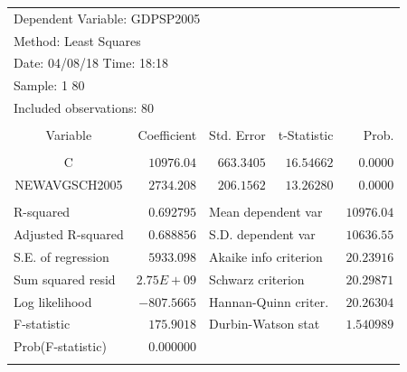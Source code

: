 \documentclass[12pt]{report}
\begin{document}
\begin{table}[H]
	\centering
	\begin{tabular}{lrrrr}
		\multicolumn{4}{l}{Dependent Variable: GDPSP2005}&\multicolumn{1}{c}{}\\
		\multicolumn{3}{l}{Method: Least Squares}&\multicolumn{1}{c}{}&\multicolumn{1}{c}{}\\
		\multicolumn{3}{l}{Date: 04/08/18   Time: 18:18}&\multicolumn{1}{c}{}&\multicolumn{1}{c}{}\\
		\multicolumn{2}{l}{Sample: 1 80}&\multicolumn{1}{c}{}&\multicolumn{1}{c}{}&\multicolumn{1}{c}{}\\
		\multicolumn{3}{l}{Included observations: 80}&\multicolumn{1}{c}{}&\multicolumn{1}{c}{}\\
		[4.5pt] \hline \\ [-4.5pt]
		\multicolumn{1}{c}{Variable}&\multicolumn{1}{r}{Coefficient}&\multicolumn{1}{r}{Std. Error}&\multicolumn{1}{r}{t-Statistic}&\multicolumn{1}{r}{Prob.}\\
		[4.5pt] \hline \\ [-4.5pt]
		\multicolumn{1}{c}{C}&\multicolumn{1}{r}{$10976.04$}&\multicolumn{1}{r}{$663.3405$}&\multicolumn{1}{r}{$16.54662$}&\multicolumn{1}{r}{$0.0000$}\\
		\multicolumn{1}{c}{NEWAVGSCH2005}&\multicolumn{1}{r}{$2734.208$}&\multicolumn{1}{r}{$206.1562$}&\multicolumn{1}{r}{$13.26280$}&\multicolumn{1}{r}{$0.0000$}\\
		[4.5pt] \hline \\ [-4.5pt]
		\multicolumn{1}{l}{R-squared}&\multicolumn{1}{r}{$0.692795$}&\multicolumn{2}{l}{Mean dependent var}&\multicolumn{1}{r}{$10976.04$}\\
		\multicolumn{1}{l}{Adjusted R-squared}&\multicolumn{1}{r}{$0.688856$}&\multicolumn{2}{l}{S.D. dependent var}&\multicolumn{1}{r}{$10636.55$}\\
		\multicolumn{1}{l}{S.E. of regression}&\multicolumn{1}{r}{$5933.098$}&\multicolumn{2}{l}{Akaike info criterion}&\multicolumn{1}{r}{$20.23916$}\\
		\multicolumn{1}{l}{Sum squared resid}&\multicolumn{1}{r}{$2.75E+09$}&\multicolumn{2}{l}{Schwarz criterion}&\multicolumn{1}{r}{$20.29871$}\\
		\multicolumn{1}{l}{Log likelihood}&\multicolumn{1}{r}{$-807.5665$}&\multicolumn{2}{l}{Hannan-Quinn criter.}&\multicolumn{1}{r}{$20.26304$}\\
		\multicolumn{1}{l}{F-statistic}&\multicolumn{1}{r}{$175.9018$}&\multicolumn{2}{l}{Durbin-Watson stat}&\multicolumn{1}{r}{$1.540989$}\\
		\multicolumn{1}{l}{Prob(F-statistic)}&\multicolumn{1}{r}{$0.000000$}&\multicolumn{1}{c}{}&\multicolumn{1}{c}{}&\multicolumn{1}{c}{}\\
		[4.5pt] \hline \\ [-4.5pt]
	\end{tabular}
\end{table}
\end{document}

